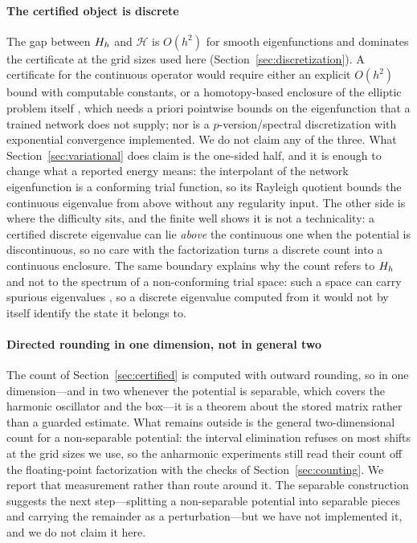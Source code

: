 \paragraph{The certified object is discrete} The gap between $H_h$ and
$\mathcal H$ is $O(h^2)$ for smooth eigenfunctions and dominates the
certificate at the grid sizes used here (Section~\ref{sec:discretization}). A
certificate for the continuous operator would require either an explicit
$O(h^2)$ bound with computable constants, or a homotopy-based enclosure of the
elliptic problem itself \citep{plum1991}, which needs a priori pointwise
bounds on the eigenfunction that a trained network does not supply; nor is a
$p$-version/spectral discretization with exponential convergence implemented.
We do not claim any of the three. What
Section~\ref{sec:variational} does claim is the one-sided half, and it is
enough to change what a reported energy means: the interpolant of the network
eigenfunction is a conforming trial function, so its Rayleigh quotient bounds
the continuous eigenvalue from above without any regularity input. The other
side is where the difficulty sits, and the finite well shows it is not a
technicality: a certified discrete eigenvalue can lie \emph{above} the
continuous one when the potential is discontinuous, so no care with the
factorization turns a discrete count into a continuous enclosure. The same boundary explains why the count
refers to $H_h$ and not to the spectrum of a non-conforming trial space: such
a space can carry spurious eigenvalues \citep{lewinsere2010}, so a discrete
eigenvalue computed from it would not by itself identify the state it belongs
to.

\paragraph{Directed rounding in one dimension, not in general two} The count
of Section~\ref{sec:certified} is computed with outward rounding, so in one
dimension---and in two whenever the potential is separable, which covers the
harmonic oscillator and the box---it is a theorem about the stored matrix
rather than a guarded estimate. What remains outside is the general
two-dimensional count for a non-separable potential: the interval elimination
refuses on most shifts at the grid sizes we use, so the anharmonic experiments
still read their count off the floating-point factorization with the checks of
Section~\ref{sec:counting}. We report that measurement rather than route
around it. The separable construction suggests the next step---splitting a
non-separable potential into separable pieces and carrying the remainder as a
perturbation---but we have not implemented it, and we do not claim it here.

